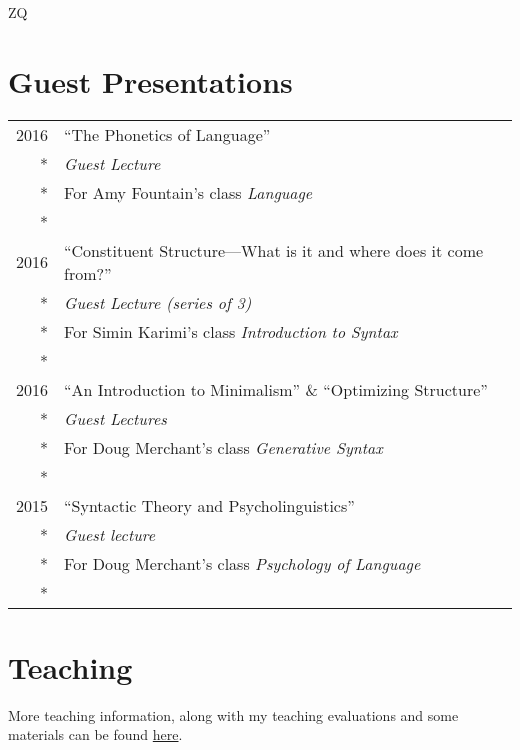 ZQ\documentclass[letterpaper,10pt]{article}
\newcommand{\entex}[4]{{\textsc{#1}}&#2\\*&\textit{#3}\\*&\footnotesize{#4}\\*\multicolumn{2}{c}{}\\}
\begin{document}
\section{Guest Presentations}


\begin{longtable}{r|p{12cm}}

\entex{2016}{``The Phonetics of Language''}{Guest Lecture}{For Amy Fountain's class \textit{Language}}

\entex{2016}{``Constituent Structure---What is it and where does it come from?''}{Guest Lecture (series of 3)}{For Simin Karimi's class \textit{Introduction to Syntax}}

\entex{2016}{``An Introduction to Minimalism'' \& ``Optimizing Structure''}{Guest Lectures}{For Doug Merchant's class \textit{Generative Syntax}}


\entex{2015}{``Syntactic Theory and Psycholinguistics''}{Guest lecture}{For Doug Merchant's class \textit{Psychology of Language}}

\end{longtable}

\section{Teaching}

More teaching information, along with my teaching evaluations and some materials can be found \href{http://www.lukesmith.xyz/classes.php}{here}.
\end{document}
